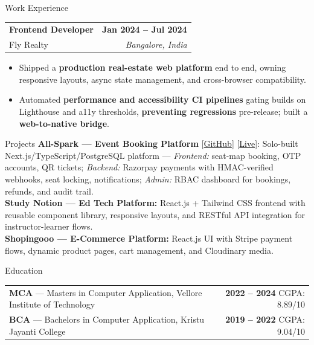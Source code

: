 \documentclass{resume}
\begin{document}
\begin{rSection}{Work Experience}
\begin{tabularx}{\textwidth}{@{} X r @{}}
\textbf{Frontend Developer} & \textbf{Jan 2024 -- Jul 2024} \\
Fly Realty & \textit{Bangalore, India}
\end{tabularx}
\begin{itemize}[leftmargin=1em,itemsep=-4pt,topsep=2pt]
    \item Shipped a \textbf{production real-estate web platform} end to end, owning responsive layouts, async state management, and cross-browser compatibility.
    \item Automated \textbf{performance and accessibility CI pipelines} gating builds on Lighthouse and a11y thresholds, \textbf{preventing regressions} pre-release; built a \textbf{web-to-native bridge}.
\end{itemize}

\end{rSection}

\begin{rSection}{Projects}
\vspace{-3pt}
\textbf{All-Spark --- Event Booking Platform} [\href{https://github.com/chirag1261/all-spark}{GitHub}] [\href{https://utsavevents.live}{Live}]: Solo-built Next.js/TypeScript/PostgreSQL platform --- \textit{Frontend:} seat-map booking, OTP accounts, QR tickets; \textit{Backend:} Razorpay payments with HMAC-verified webhooks, seat locking, notifications; \textit{Admin:} RBAC dashboard for bookings, refunds, and audit trail. \\[2pt]
\textbf{Study Notion --- Ed Tech Platform:} React.js + Tailwind CSS frontend with reusable component library, responsive layouts, and RESTful API integration for instructor-learner flows. \\[2pt]
\textbf{Shopingooo --- E-Commerce Platform:} React.js UI with Stripe payment flows, dynamic product pages, cart management, and Cloudinary media.
\vspace{-4pt}
\end{rSection}

\begin{rSection}{Education}
\vspace{-3pt}
\begin{tabularx}{\textwidth}{@{} X r @{}}
\textbf{MCA} --- Masters in Computer Application, Vellore Institute of Technology & \textbf{2022 -- 2024} \quad CGPA: 8.89/10 \\
\textbf{BCA} --- Bachelors in Computer Application, Kristu Jayanti College        & \textbf{2019 -- 2022} \quad CGPA: 9.04/10 \\
\end{tabularx}
\vspace{-4pt}
\end{rSection}
\end{document}
